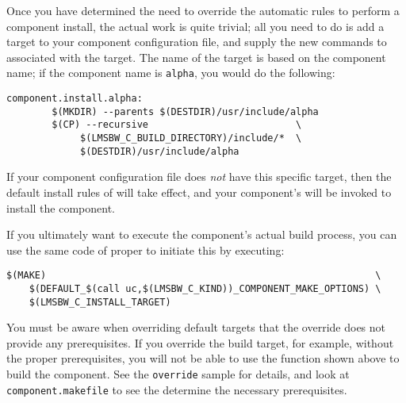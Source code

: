 Once you have determined the need to override the automatic rules to
perform a component install, the actual work is quite trivial; all you
need to do is add a \makefile target to your component configuration
file, and supply the new commands to associated with the target.  The
name of the target is based on the component name; if the component
name is \texttt{alpha}, you would do the following:


\begin{verbatim}
component.install.alpha:
        $(MKDIR) --parents $(DESTDIR)/usr/include/alpha
        $(CP) --recursive                          \
             $(LMSBW_C_BUILD_DIRECTORY)/include/*  \
             $(DESTDIR)/usr/include/alpha
\end{verbatim}

If your component configuration file does \emph{not} have this
specific target, then the default install rules of \lmsbw will take
effect, and your component's \makefile will be invoked to install the
component.

If you ultimately want to execute the component's actual build
process, you can use the same code of \lmsbw proper to initiate this
by executing:

\begin{footnotesize}
\begin{verbatim}
$(MAKE)                                                          \
    $(DEFAULT_$(call uc,$(LMSBW_C_KIND))_COMPONENT_MAKE_OPTIONS) \
    $(LMSBW_C_INSTALL_TARGET)
\end{verbatim}
\end{footnotesize}


You must be aware when overriding default targets that the override
does not provide any prerequisites.  If you override the build target,
for example, without the proper prerequisites, you will not be able to
use the function shown above to build the component.  See the
\texttt{override} sample for details, and look at
\texttt{component.makefile} to see the determine the necessary
prerequisites.

